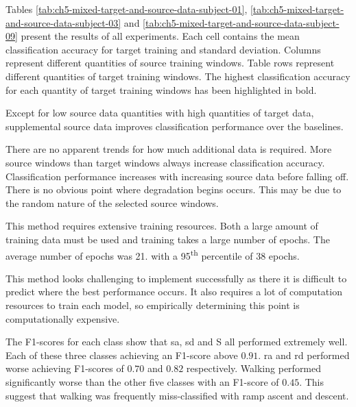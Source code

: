 Tables \ref{tab:ch5-mixed-target-and-source-data-subject-01}, \ref{tab:ch5-mixed-target-and-source-data-subject-03} and \ref{tab:ch5-mixed-target-and-source-data-subject-09} present the results of all experiments. Each cell contains the mean classification accuracy for target training and standard deviation. Columns represent different quantities of source training windows. Table rows represent different quantities of target training windows. The highest classification accuracy for each quantity of target training windows has been highlighted in bold.



Except for low source data quantities with high quantities of target data, supplemental source data improves classification performance over the baselines.

There are no apparent trends for how much additional data is required. More source windows than target windows always increase classification accuracy. Classification performance increases with increasing source data before falling off. There is no obvious point where degradation begins occurs. This may be due to the random nature of the selected source windows.

This method requires extensive training resources. Both a large amount of training data must be used and training takes a large number of epochs. The average number of epochs was 21. with a 95\textsuperscript{th} percentile of 38 epochs.

This method looks challenging to implement successfully as there it is difficult to predict where the best performance occurs. It also requires a lot of computation resources to train each model, so empirically determining this point is computationally expensive.

The F1-scores for each class show that \acrshort{sa}, \acrshort{sd} and S all performed extremely well. Each of these three classes achieving an F1-score above $0.91$. \acrshort{ra} and \acrshort{rd} performed worse achieving F1-scores of $0.70$ and $0.82$ respectively. Walking performed significantly worse than the other five classes with an F1-score of $0.45$. This suggest that walking was frequently miss-classified with ramp ascent and descent.

